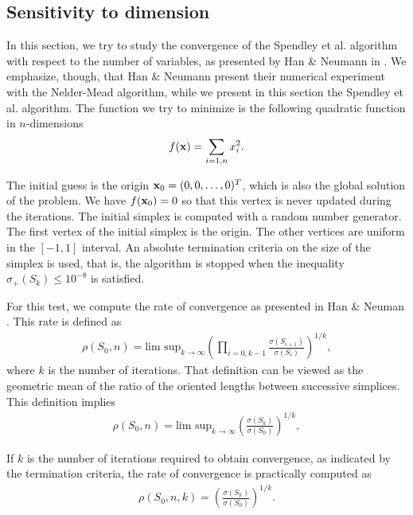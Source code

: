 \subsection{Sensitivity to dimension}

In this section, we try to study the convergence of the 
Spendley et al. algorithm with respect to the number of variables,
as presented by Han \& Neumann in \cite{HanNeumann2006}.
We emphasize, though, that Han \& Neumann present their numerical 
experiment with the Nelder-Mead algorithm, while we present 
in this section the Spendley et al. algorithm.
The function we try to minimize is the following quadratic function 
in $n$-dimensions 
\begin{eqnarray}
\label{quadratic-sp-function3}
f(\mathbf{x}) = \sum_{i=1,n} x_i^2.
\end{eqnarray}

The initial guess is the origin $\mathbf{x}_0 = (0,0,\ldots,0)^T$,
which is also the global solution of the problem.
We have $f(\mathbf{x}_0)=0$ so that this vertex is never updated 
during the iterations.
The initial simplex is computed with a random number generator.
The first vertex of the initial simplex is the origin.
The other vertices are uniform in the $[-1,1]$ interval.
An absolute termination criteria on the size of the simplex is used, 
that is, the algorithm is stopped when the inequality 
$\sigma_+(S_k) \leq 10^{-8}$ is satisfied.

For this test, we compute the rate of convergence as presented
in Han \& Neuman \cite{HanNeumann2006}. This rate is defined as 
\begin{eqnarray}
\label{rho-sp-rate-convergence}
\rho(S_0,n) = \textrm{lim sup}_{k\rightarrow \infty} 
\left(\prod_{i=0,k-1} \frac{\sigma(S_{i+1})}{\sigma(S_i)}\right)^{1/k},
\end{eqnarray}
where $k$ is the number of iterations.
That definition can be viewed as the geometric mean of the ratio of the 
oriented lengths between successive simplices.
This definition implies 
\begin{eqnarray}
\label{rho-sp-rate-convergence2}
\rho(S_0,n) = \textrm{lim sup}_{k\rightarrow \infty} 
\left(\frac{\sigma(S_k)}{\sigma(S_0)}\right)^{1/k},
\end{eqnarray}

If $k$ is the number of iterations required to obtain convergence, as 
indicated by the termination criteria, the rate of convergence is practically computed as 
\begin{eqnarray}
\rho(S_0,n,k) = \left( \frac{\sigma(S_{k})}{\sigma(S_0)}\right)^{1/k}.
\end{eqnarray}

